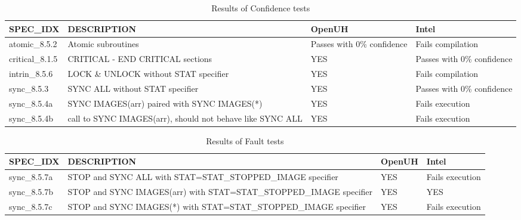 \begin{table}[tbh!]
\caption{Results of Confidence tests}
\label{tab:confidence}
\begin{tabular}{|l|p{6cm}|p{2cm}|p{2cm}|}
\hline
SPEC\_IDX          &  DESCRIPTION  & OpenUH & Intel \\\hline
atomic\_8.5.2      &  Atomic subroutines & Passes with 0\% confidence & Fails compilation \\\hline
critical\_8.1.5    &  CRITICAL - END CRITICAL sections & YES & Passes with 0\% confidence \\\hline
intrin\_8.5.6      &  LOCK \& UNLOCK without STAT specifier & YES & Fails compilation \\\hline
sync\_8.5.3        &  SYNC ALL without STAT specifier & YES & Passes with 0\% confidence \\\hline
sync\_8.5.4a       &  SYNC IMAGES(arr) paired with SYNC IMAGES(*) & YES & Fails execution \\\hline
sync\_8.5.4b       &  call to SYNC IMAGES(arr), should not behave like SYNC ALL & YES & Fails execution \\\hline
\end{tabular}
\end{table}


\begin{table}[tbh!]
\caption{Results of Fault tests}
\label{tab:fault}
\begin{tabular}{|l|p{6cm}|p{2cm}|p{2cm}|}
\hline
SPEC\_IDX          &      DESCRIPTION  & OpenUH & Intel \\\hline
sync\_8.5.7a       &      STOP and SYNC ALL with STAT=STAT\_STOPPED\_IMAGE specifier & YES & Fails execution \\\hline
sync\_8.5.7b       &      STOP and SYNC IMAGES(arr) with STAT=STAT\_STOPPED\_IMAGE specifier & YES & YES \\\hline
sync\_8.5.7c       &      STOP and SYNC IMAGES(*) with STAT=STAT\_STOPPED\_IMAGE specifier & YES & Fails execution \\\hline
\end{tabular}
\end{table}

